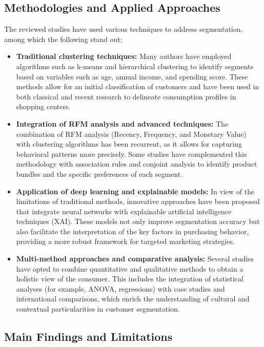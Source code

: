 \documentclass[10pt]{article}
\begin{document}
\subsection{Methodologies and Applied Approaches}

The reviewed studies have used various techniques to address segmentation, among which the following stand out:

\begin{itemize}
    \item \textbf{Traditional clustering techniques:} Many authors have employed algorithms such as k-means and hierarchical clustering to identify segments based on variables such as age, annual income, and spending score. These methods allow for an initial classification of customers and have been used in both classical and recent research to delineate consumption profiles in shopping centers.
    
    \item \textbf{Integration of RFM analysis and advanced techniques:} The combination of RFM analysis (Recency, Frequency, and Monetary Value) with clustering algorithms has been recurrent, as it allows for capturing behavioral patterns more precisely. Some studies have complemented this methodology with association rules and conjoint analysis to identify product bundles and the specific preferences of each segment.
    
    \item \textbf{Application of deep learning and explainable models:} In view of the limitations of traditional methods, innovative approaches have been proposed that integrate neural networks with explainable artificial intelligence techniques (XAI). These models not only improve segmentation accuracy but also facilitate the interpretation of the key factors in purchasing behavior, providing a more robust framework for targeted marketing strategies.
    
    \item \textbf{Multi-method approaches and comparative analysis:} Several studies have opted to combine quantitative and qualitative methods to obtain a holistic view of the consumer. This includes the integration of statistical analyses (for example, ANOVA, regressions) with case studies and international comparisons, which enrich the understanding of cultural and contextual particularities in customer segmentation.
\end{itemize}

\subsection{Main Findings and Limitations}
\end{document}
